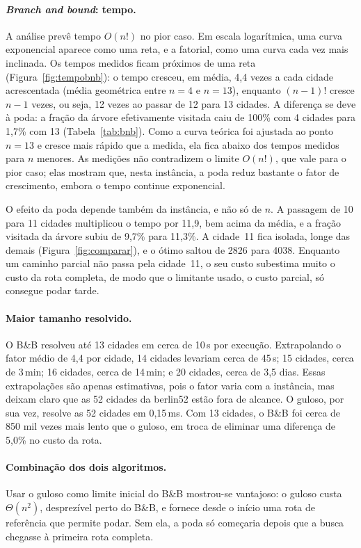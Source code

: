 \documentclass[12pt,a4paper]{article}
\begin{document}
\paragraph{\emph{Branch and bound}: tempo.} A análise prevê tempo $O(n!)$ no pior caso. Em escala logarítmica, uma curva exponencial aparece como uma reta, e a fatorial, como uma curva cada vez mais inclinada. Os tempos medidos ficam próximos de uma reta (Figura~\ref{fig:tempobnb}): o tempo cresceu, em média, 4,4 vezes a cada cidade acrescentada (média geométrica entre $n = 4$ e $n = 13$), enquanto $(n-1)!$ cresce $n - 1$ vezes, ou seja, 12 vezes ao passar de 12 para 13 cidades. A diferença se deve à poda: a fração da árvore efetivamente visitada caiu de 100\% com 4 cidades para 1,7\% com 13 (Tabela~\ref{tab:bnb}). Como a curva teórica foi ajustada ao ponto $n = 13$ e cresce mais rápido que a medida, ela fica abaixo dos tempos medidos para $n$ menores. As medições não contradizem o limite $O(n!)$, que vale para o pior caso; elas mostram que, nesta instância, a poda reduz bastante o fator de crescimento, embora o tempo continue exponencial.

O efeito da poda depende também da instância, e não só de $n$. A passagem de 10 para 11 cidades multiplicou o tempo por 11,9, bem acima da média, e a fração visitada da árvore subiu de 9,7\% para 11,3\%. A cidade~11 fica isolada, longe das demais (Figura~\ref{fig:comparar}), e o ótimo saltou de 2826 para 4038. Enquanto um caminho parcial não passa pela cidade~11, o seu custo subestima muito o custo da rota completa, de modo que o limitante usado, o custo parcial, só consegue podar tarde.

\paragraph{Maior tamanho resolvido.} O B\&B resolveu até 13 cidades em cerca de 10\,s por execução. Extrapolando o fator médio de 4,4 por cidade, 14 cidades levariam cerca de 45\,s; 15 cidades, cerca de 3\,min; 16 cidades, cerca de 14\,min; e 20 cidades, cerca de 3,5 dias. Essas extrapolações são apenas estimativas, pois o fator varia com a instância, mas deixam claro que as 52 cidades da berlin52 estão fora de alcance. O guloso, por sua vez, resolve as 52 cidades em 0,15\,ms. Com 13 cidades, o B\&B foi cerca de 850 mil vezes mais lento que o guloso, em troca de eliminar uma diferença de 5,0\% no custo da rota.

\paragraph{Combinação dos dois algoritmos.} Usar o guloso como limite inicial do B\&B mostrou-se vantajoso: o guloso custa $\Theta(n^2)$, desprezível perto do B\&B, e fornece desde o início uma rota de referência que permite podar. Sem ela, a poda só começaria depois que a busca chegasse à primeira rota completa.
\end{document}
